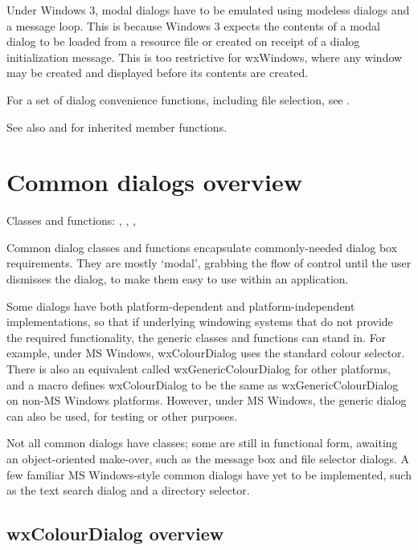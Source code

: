 Under Windows 3, modal dialogs have to be emulated using
modeless dialogs and a message loop. This is because Windows 3 expects
the contents of a modal dialog to be loaded from a resource file or
created on receipt of a dialog initialization message. This is too
restrictive for wxWindows, where any window may be created and displayed
before its contents are created.

For a set of dialog convenience functions, including file selection, see
\rtfsp{}.

See also  and  for inherited
member functions.


\section{Common dialogs overview}\label{commondialogsoverview}

Classes and functions: , ,
\rtfsp{}, \rtfsp{}

Common dialog classes and functions encapsulate commonly-needed dialog box requirements.
They are mostly `modal', grabbing the flow of control until the user dismisses the dialog,
to make them easy to use within an application.

Some dialogs have both platform-dependent and platform-independent implementations,
so that if underlying windowing systems that do not provide the required functionality,
the generic classes and functions can stand in. For example, under MS Windows, wxColourDialog
uses the standard colour selector. There is also an equivalent called wxGenericColourDialog
for other platforms, and a macro defines wxColourDialog to be the same as wxGenericColourDialog
on non-MS Windows platforms. However, under MS Windows, the generic dialog can also be
used, for testing or other purposes.

Not all common dialogs have classes; some are still in functional form, awaiting
an object-oriented make-over, such as the message box and file selector
dialogs. A few familiar MS Windows-style common dialogs have yet to be implemented,
such as the text search dialog and a directory selector.

\subsection{wxColourDialog overview}\label{wxcolourdialogoverview}

